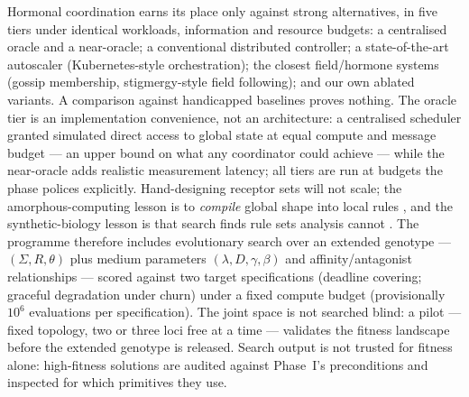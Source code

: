 \documentclass[twoside,twocolumn,usenatbib]{mnras}
\begin{document}
Hormonal coordination earns its place only against strong
alternatives, in five tiers under identical workloads, information
and resource budgets: a centralised oracle and a near-oracle; a
conventional distributed controller; a state-of-the-art autoscaler
(Kubernetes-style orchestration); the closest field/hormone systems
(gossip membership, stigmergy-style field following); and our own
ablated variants. A comparison against handicapped baselines proves
nothing. The oracle tier is an implementation convenience, not an
architecture: a centralised scheduler granted simulated direct access
to global state at equal compute and message budget --- an upper bound
on what any coordinator could achieve --- while the near-oracle adds
realistic measurement latency; all tiers are run at budgets the phase
polices explicitly. Hand-designing receptor sets will not scale;
the amorphous-computing lesson is to \emph{compile} global shape into
local rules \citep{nagpal2003}, and the synthetic-biology lesson is
that search finds rule sets analysis cannot \citep{basu2005, you2004}.
The programme therefore includes evolutionary search over an extended
genotype --- $(\Sigma, R, \theta)$ plus medium parameters $(\lambda, D,
\gamma, \beta)$ and affinity/antagonist relationships --- scored
against two target specifications (deadline covering; graceful
degradation under churn) under a fixed compute budget (provisionally
$10^6$ evaluations per specification). The joint space is not searched
blind: a pilot --- fixed topology, two or three loci free at a time
--- validates the fitness landscape before the extended genotype is
released. Search output is
not trusted for fitness alone: high-fitness solutions are audited
against Phase~I's preconditions and inspected for which primitives
they use.
\end{document}
